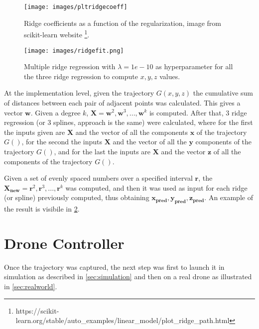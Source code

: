 \begin{figure}[H]
	\begin{minipage}{\textwidth}
		\centering
		\texttt{[image: images/pltridgecoeff]}
		\caption[Ridge coefficients as a function of the regularization.]{Ridge coefficients as a function of the regularization, image from scikit-learn website \footnote{https://scikit-learn.org/stable/auto\_examples/linear\_model/plot\_ridge\_path.html}.}
		\label{fig:pltridgecoeff}
	\end{minipage}
\end{figure}

\begin{figure}[h]
	\centering
	\texttt{[image: images/ridgefit.png]}
	\caption[Multiple Ridge regression.]{Multiple ridge regression with $\lambda = 1e-10$ as hyperparameter for all the three ridge regression to compute $x, y, z$ values.}
	\label{fig:multiridge}
\end{figure}

\noindent At the implementation level, given the trajectory $G(x, y, z)$ the cumulative sum of distances between each pair of adjacent points was calculated. This gives a vector $\bm{w}$. Given a degree $k$, $\bm{X} = \bm{w}^2, \bm{w}^3,...,\bm{w}^k$ is computed. After that, $3$ ridge regression (or $3$ splines, approach is the same) were calculated, where for the first the inputs given are $\bm{X}$ and the vector of all the components $\bm{x}$ of the trajectory $G()$, for the second the inputs $\bm{X}$ and the vector of all the $\bm{y}$ components of the trajectory $G()$, and for the last the inputs are $\bm{X}$ and the vector $\bm{z}$ of all the components of the trajectory $G()$. 

\noindent Given a set of evenly spaced numbers over a specified interval $\bm{r}$, the $\bm{X_{new}} = \bm{r}^2, \bm{r}^3,...,\bm{r}^k$ was computed, and then it was used as input for each ridge (or spline) previously computed, thus obtaining $\bm{x_{pred}}, \bm{y_{pred}}, \bm{z_{pred}}$. An example of the result is visibile in \ref{fig:multiridge}.

\section{Drone Controller}
\label{sec:dronecontrl}
Once the trajectory was captured, the next step was first to launch it in simulation as described in \ref{sec:simulation} and then on a real drone as illustrated in \ref{sec:realworld}.


